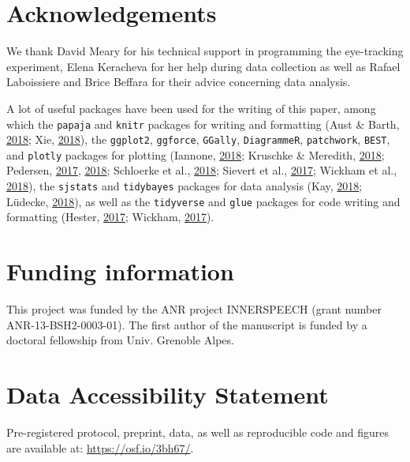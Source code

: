 \documentclass[a4paper,12pt,twoside,openright,oldfontcommands,final]{memoir}
\begin{document}
\hypertarget{acknowledgements-3}{%
\section{Acknowledgements}\label{acknowledgements-3}}

We thank David Meary for his technical support in programming the eye-tracking experiment, Elena Keracheva for her help during data collection as well as Rafael Laboissiere and Brice Beffara for their advice concerning data analysis.

A lot of useful packages have been used for the writing of this paper, among which the \texttt{papaja} and \texttt{knitr} packages for writing and formatting (Aust \& Barth, \protect\hyperlink{ref-R-papaja}{2018}; Xie, \protect\hyperlink{ref-R-knitr}{2018}), the \texttt{ggplot2}, \texttt{ggforce}, \texttt{GGally}, \texttt{DiagrammeR}, \texttt{patchwork}, \texttt{BEST}, and \texttt{plotly} packages for plotting (Iannone, \protect\hyperlink{ref-R-DiagrammeR}{2018}; Kruschke \& Meredith, \protect\hyperlink{ref-R-BEST}{2018}; Pedersen, \protect\hyperlink{ref-R-patchwork}{2017}, \protect\hyperlink{ref-R-ggforce}{2018}; Schloerke et al., \protect\hyperlink{ref-R-GGally}{2018}; Sievert et al., \protect\hyperlink{ref-R-plotly}{2017}; Wickham et al., \protect\hyperlink{ref-R-ggplot2}{2018}), the \texttt{sjstats} and \texttt{tidybayes} packages for data analysis (Kay, \protect\hyperlink{ref-R-tidybayes}{2018}; Lüdecke, \protect\hyperlink{ref-R-sjstats}{2018}), as well as the \texttt{tidyverse} and \texttt{glue} packages for code writing and formatting (Hester, \protect\hyperlink{ref-R-glue}{2017}; Wickham, \protect\hyperlink{ref-R-tidyverse}{2017}).

\hypertarget{funding-information}{%
\section{Funding information}\label{funding-information}}

This project was funded by the ANR project INNERSPEECH (grant number ANR-13-BSH2-0003-01). The first author of the manuscript is funded by a doctoral fellowship from Univ. Grenoble Alpes.

\hypertarget{suppCh6}{%
\section{Data Accessibility Statement}\label{suppCh6}}

Pre-registered protocol, preprint, data, as well as reproducible code and figures are available at: \href{http://osf.io/3bh67}{https://osf.io/3bh67/}.
\end{document}
